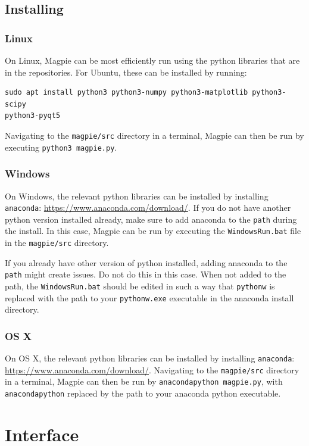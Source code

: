 \documentclass[11pt,a4paper]{article}
\begin{document}
\subsection{Installing}
\subsubsection{Linux}
On Linux, Magpie can be most efficiently run using the python libraries that are in the
repositories. For Ubuntu, these can be installed by running:
\begin{verbatim}
sudo apt install python3 python3-numpy python3-matplotlib python3-scipy
python3-pyqt5
\end{verbatim}
Navigating to the \texttt{magpie/src} directory in a terminal, Magpie can then be run
by executing \texttt{python3 magpie.py}.

\subsubsection{Windows}
On Windows, the relevant python libraries can be installed by installing \texttt{anaconda}:
\url{https://www.anaconda.com/download/}. If you do not have another python version installed
already, make sure to add anaconda to the \texttt{path} during the install. In this case, Magpie can
be run by executing the \texttt{WindowsRun.bat} file in the \texttt{magpie/src} directory. %

If you already have other version of python installed, adding anaconda to the \texttt{path} might
create issues. Do not do this in this case. When not added to the path, the \texttt{WindowsRun.bat}
should be edited in such a way that \texttt{pythonw} is replaced with the path to your
\texttt{pythonw.exe} executable in the anaconda install directory.

\subsubsection{OS X}
On OS X, the relevant python libraries can be installed by installing \texttt{anaconda}:
\url{https://www.anaconda.com/download/}. Navigating to the \texttt{magpie/src} directory in a terminal, Magpie can then be run
by \texttt{anacondapython magpie.py}, with \texttt{anacondapython} replaced by the path to your
anaconda python executable.


\section{Interface}
\end{document}
